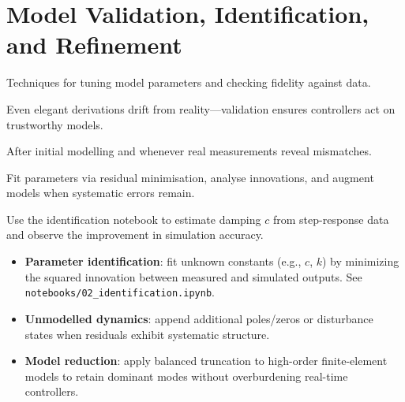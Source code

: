 \section{Model Validation, Identification, and Refinement}
\begin{beginnerguide}
    \item[\textbf{What?}] Techniques for tuning model parameters and checking fidelity against data.
    \item[\textbf{Why?}] Even elegant derivations drift from reality—validation ensures controllers act on trustworthy models.
    \item[\textbf{When?}] After initial modelling and whenever real measurements reveal mismatches.
    \item[\textbf{How?}] Fit parameters via residual minimisation, analyse innovations, and augment models when systematic errors remain.
    \item[\textbf{Example}] Use the identification notebook to estimate damping $c$ from step-response data and observe the improvement in simulation accuracy.
\end{beginnerguide}
\begin{itemize}[leftmargin=*]
    \item \textbf{Parameter identification}: fit unknown constants (e.g., $c$, $k$) by minimizing the squared innovation between measured and simulated outputs. See \texttt{notebooks/02\_identification.ipynb}.
    \item \textbf{Unmodelled dynamics}: append additional poles/zeros or disturbance states when residuals exhibit systematic structure.
    \item \textbf{Model reduction}: apply balanced truncation to high-order finite-element models to retain dominant modes without overburdening real-time controllers.
\end{itemize}

